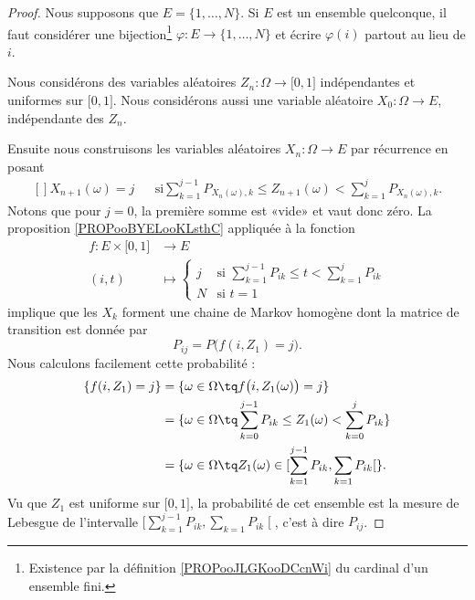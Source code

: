 \begin{proof}
    Nous supposons que \( E=\{ 1,\ldots, N \}\). Si \( E\) est un ensemble quelconque, il faut considérer une bijection\footnote{Existence par la définition \ref{PROPooJLGKooDCcnWi} du cardinal d'un ensemble fini.} \( \varphi\colon E\to \{ 1,\ldots, N \}\) et écrire \( \varphi(i)\) partout au lieu de \( i\).

    Nous considérons des variables aléatoires \( Z_n\colon \Omega \to \mathopen[ 0 , 1 \mathclose] \) indépendantes et uniformes sur \( \mathopen[ 0 , 1 \mathclose]\). Nous considérons aussi une variable aléatoire \( X_0\colon \Omega\to E\), indépendante des \( Z_n\).

    Ensuite nous construisons les variables aléatoires \( X_n\colon \Omega\to E\) par récurrence en posant
    \begin{equation}
        \begin{aligned}[]
        X_{n+1}(\omega)=j&&\text{si} \sum_{k=1}^{j-1}P_{X_n(\omega),k}\leq Z_{n+1}(\omega)<\sum_{k=1}^jP_{X_n(\omega),k}.
        \end{aligned}
    \end{equation}
    Notons que pour \( j=0\), la première somme est «vide» et vaut donc zéro. La proposition \ref{PROPooBYELooKLsthC} appliquée à la fonction
    \begin{equation}
        \begin{aligned}
            f\colon E\times \mathopen[ 0 , 1 \mathclose]&\to E \\
            (i,t)&\mapsto \begin{cases}
                j      &\text{si } \sum_{k=1}^{j-1} P_{ik}\leq t<\sum_{k=1}^jP_{ik}\\
                N    &    \text{si } t=1
            \end{cases}
        \end{aligned}
    \end{equation}
    implique que les \( X_k\) forment une chaine de Markov homogène dont la matrice de transition est donnée par
    \begin{equation}
        P_{ij}=P\big( f(i,Z_1)=j \big).
    \end{equation}
    Nous calculons facilement cette probabilité :
    \begin{subequations}
        \begin{align}
            \{ f(i,Z_1)=j \}&=\{ \omega\in\Omega\tq f\big( i,Z_1(\omega) \big)=j \}\\
            &=\{ \omega\in\Omega\tq \sum_{k=0}^{j-1}P_{ik}\leq Z_1(\omega)<\sum_{k=0}^{j}P_{ik} \}\\
            &=\{ \omega\in\Omega\tq Z_1(\omega)\in\mathopen[ \sum_{k=1}^{j-1}P_{ik} , \sum_{k=1}P_{ik} \mathclose[ \}.
        \end{align}
    \end{subequations}
    Vu que \( Z_1\) est uniforme sur \( \mathopen[ 0 , 1 \mathclose]\), la probabilité de cet ensemble est la mesure de Lebesgue de l'intervalle \( \mathopen[ \sum_{k=1}^{j-1}P_{ik} , \sum_{k=1}P_{ik} \mathclose[\), c'est à dire \( P_{ij}\).
\end{proof}


